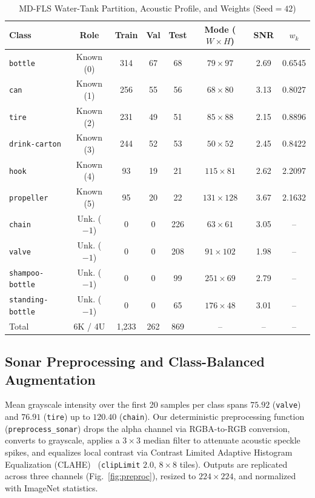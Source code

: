 \documentclass[conference]{IEEEtran}
\begin{document}
\begin{table}[!htbp]
\centering
\caption{MD-FLS Water-Tank Partition, Acoustic Profile, and Weights ($\text{Seed}=42$)}
\label{tab:dataset}
\scriptsize
\setlength{\tabcolsep}{2.2pt}
\begin{tabular}{@{}lccccccc@{}}
\toprule
Class & Role & Train & Val & Test & Mode ($W{\times}H$) & SNR & $w_k$ \\
\midrule
\texttt{bottle}          & Known (0)   & 314 & 67 & 68  & $79\times 97$   & 2.69 & 0.6545 \\
\texttt{can}             & Known (1)   & 256 & 55 & 56  & $68\times 80$   & 3.13 & 0.8027 \\
\texttt{tire}            & Known (2)   & 231 & 49 & 51  & $85\times 88$   & 2.15 & 0.8896 \\
\texttt{drink-carton}    & Known (3)   & 244 & 52 & 53  & $50\times 52$   & 2.45 & 0.8422 \\
\texttt{hook}            & Known (4)   & 93  & 19 & 21  & $115\times 81$  & 2.62 & 2.2097 \\
\texttt{propeller}       & Known (5)   & 95  & 20 & 22  & $131\times 128$ & 3.67 & 2.1632 \\
\midrule
\texttt{chain}           & Unk. ($-1$) & 0   & 0  & 226 & $63\times 61$   & 3.05 & -- \\
\texttt{valve}           & Unk. ($-1$) & 0   & 0  & 208 & $91\times 102$  & 1.98 & -- \\
\texttt{shampoo-bottle}  & Unk. ($-1$) & 0   & 0  & 99  & $251\times 69$  & 2.79 & -- \\
\texttt{standing-bottle} & Unk. ($-1$) & 0   & 0  & 65  & $176\times 48$  & 3.01 & -- \\
\midrule
Total                    & 6K / 4U     & 1,233 & 262 & 869 & --            & --   & -- \\
\bottomrule
\end{tabular}
\end{table}

\subsection{Sonar Preprocessing and Class-Balanced Augmentation}
\label{sec:preproc}

Mean grayscale intensity over the first 20 samples per class spans $75.92$ (\texttt{valve}) and $76.91$ (\texttt{tire}) up to $120.40$ (\texttt{chain}). Our deterministic preprocessing function (\texttt{preprocess\_sonar}) drops the alpha channel via RGBA-to-RGB conversion, converts to grayscale, applies a $3\times 3$ median filter to attenuate acoustic speckle spikes, and equalizes local contrast via Contrast Limited Adaptive Histogram Equalization (CLAHE)~\cite{zuiderveld_1994_clahe} (\texttt{clipLimit} $2.0$, $8\times 8$ tiles). Outputs are replicated across three channels (Fig.~\ref{fig:preproc}), resized to $224\times 224$, and normalized with ImageNet statistics.
\end{document}
